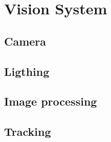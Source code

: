 \chapter{Vision System}
\section{Camera}
\section{Ligthing}
\section{Image processing}
\section{Tracking}


